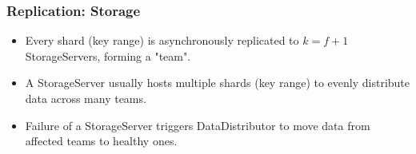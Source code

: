 

\begin{frame}
	\frametitle{Replication: Storage}
\begin{itemize}

      \item Every shard (key range) is asynchronously replicated to \( k = f + 1 \) StorageServers, forming a "team".
      \item A StorageServer usually hosts multiple shards (key range) to evenly distribute data across many teams.
      \item Failure of a StorageServer triggers DataDistributor to move data from affected teams to healthy ones.

\end{itemize}
\end{frame}